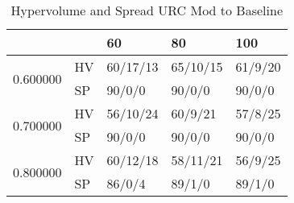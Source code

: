 \begin{table}
\caption{Hypervolume and Spread URC Mod to Baseline}
\begin{tabular}{lllll}
\toprule
 &  & 60 & 80 & 100 \\
\midrule
\multirow[t]{2}{*}{0.600000} & HV & 60/17/13 & 65/10/15 & 61/9/20 \\
 & SP & 90/0/0 & 90/0/0 & 90/0/0 \\
\cline{1-5}
\multirow[t]{2}{*}{0.700000} & HV & 56/10/24 & 60/9/21 & 57/8/25 \\
 & SP & 90/0/0 & 90/0/0 & 90/0/0 \\
\cline{1-5}
\multirow[t]{2}{*}{0.800000} & HV & 60/12/18 & 58/11/21 & 56/9/25 \\
 & SP & 86/0/4 & 89/1/0 & 89/1/0 \\
\cline{1-5}
\bottomrule
\end{tabular}
\end{table}
